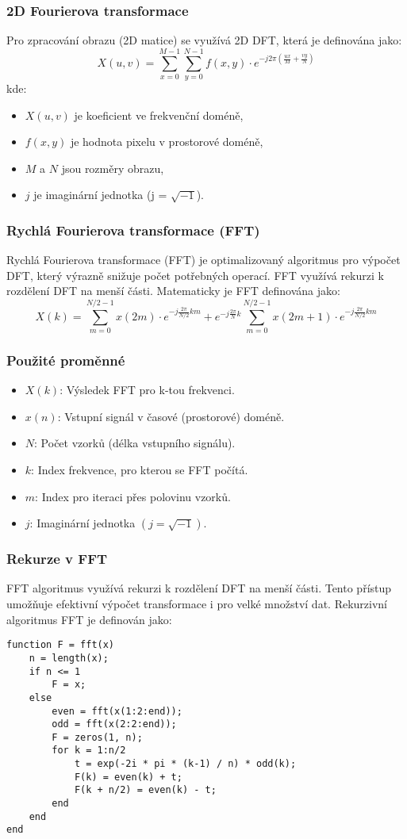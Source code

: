 \subsubsection{2D Fourierova transformace}
Pro zpracování obrazu (2D matice) se využívá 2D DFT, která je definována jako:
\[
X(u, v) = \sum_{x=0}^{M-1} \sum_{y=0}^{N-1} f(x, y) \cdot e^{-j 2\pi \left( \frac{ux}{M} + \frac{vy}{N} \right)}
\]
kde:
\begin{itemize}
    \item \( X(u, v) \) je koeficient ve frekvenční doméně,
    \item \( f(x, y) \) je hodnota pixelu v prostorové doméně,
    \item \( M \) a \( N \) jsou rozměry obrazu,
    \item \( j \) je imaginární jednotka (j = \(\sqrt{-1}\)).
\end{itemize}

\subsubsection{Rychlá Fourierova transformace (FFT)}
Rychlá Fourierova transformace (FFT) je optimalizovaný algoritmus pro výpočet DFT, který výrazně snižuje počet potřebných operací. FFT využívá rekurzi k rozdělení DFT na menší části. Matematicky je FFT definována jako:
\[
X(k) = \sum_{m=0}^{N/2-1} x(2m) \cdot e^{-j \frac{2\pi}{N/2} km} + e^{-j \frac{2\pi}{N} k} \sum_{m=0}^{N/2-1} x(2m+1) \cdot e^{-j \frac{2\pi}{N/2} km}
\]

\subsubsection{Použité proměnné}
\begin{itemize}
    \item \( X(k) \): Výsledek FFT pro k-tou frekvenci.
    \item \( x(n) \): Vstupní signál v časové (prostorové) doméně.
    \item \( N \): Počet vzorků (délka vstupního signálu).
    \item \( k \): Index frekvence, pro kterou se FFT počítá.
    \item \( m \): Index pro iteraci přes polovinu vzorků.
    \item \( j \): Imaginární jednotka \((j = \sqrt{-1})\).
\end{itemize}

\subsubsection*{Rekurze v FFT}
FFT algoritmus využívá rekurzi k rozdělení DFT na menší části. Tento přístup umožňuje efektivní výpočet transformace i pro velké množství dat. Rekurzivní algoritmus FFT je definován jako:
\begin{verbatim}
function F = fft(x)
    n = length(x);
    if n <= 1
        F = x;
    else
        even = fft(x(1:2:end));
        odd = fft(x(2:2:end));
        F = zeros(1, n);
        for k = 1:n/2
            t = exp(-2i * pi * (k-1) / n) * odd(k);
            F(k) = even(k) + t;
            F(k + n/2) = even(k) - t;
        end
    end
end
\end{verbatim}

